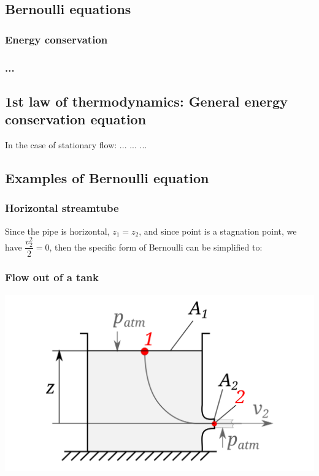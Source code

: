 \documentclass{article}
\begin{document}
\subsection{Bernoulli equations}
\subsubsection{Energy conservation}

\subsubsection{...}



\newpage
\subsection{1st law of thermodynamics: General energy conservation equation}

In the case of stationary flow:
... ... ...



\subsection{Examples of Bernoulli equation}
\subsubsection{Horizontal streamtube}
Since the pipe is horizontal, $z_1 = z_2$, and since point  is a stagnation point,
we have $\dfrac{v_2^2}{2} = 0$, then the specific form of Bernoulli can be simplified to:

\subsubsection{Flow out of a tank}
\begin{center}
    \includegraphics[width=.7\textwidth]{media/torricelli.png}
\end{center}
\end{document}
